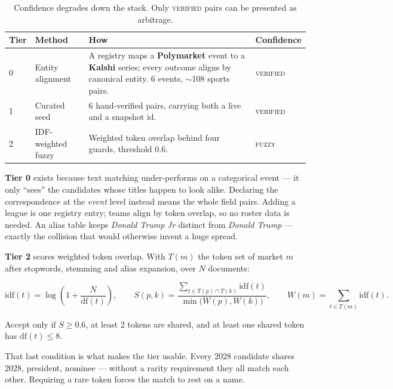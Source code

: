 \documentclass[11pt,a4paper]{article}
\newcommand{\code}[1]{{\ttfamily\small #1}}
\newcommand{\PM}{{\color{poly}\textbf{Polymarket}}}
\newcommand{\KS}{{\color{kalshi}\textbf{Kalshi}}}
\begin{document}
\begin{table}[htbp]
\centering\small
\begin{tabularx}{\textwidth}{@{}p{1.3cm}p{2.8cm}Xp{1.7cm}@{}}
\toprule
\textbf{Tier} & \textbf{Method} & \textbf{How} & \textbf{Confidence} \\
\midrule
0 & Entity alignment & A registry maps a \PM{} event to a \KS{} series; every outcome aligns by
  canonical entity. 6 events, $\sim$108 sports pairs. & \textsc{verified} \\
1 & Curated seed & 6 hand-verified pairs, carrying both a live and a snapshot id. & \textsc{verified} \\
2 & IDF-weighted fuzzy & Weighted token overlap behind four guards, threshold $0.6$. & \textsc{fuzzy} \\
\bottomrule
\end{tabularx}
\caption{Confidence degrades down the stack. Only \textsc{verified} pairs can be presented as
arbitrage.}
\end{table}

\textbf{Tier 0} exists because text matching under-performs on a categorical event --- it only
``sees'' the candidates whose titles happen to look alike. Declaring the correspondence at the
\emph{event} level instead means the whole field pairs. Adding a league is one registry entry;
teams align by token overlap, so no roster data is needed. An alias table keeps \emph{Donald
Trump Jr} distinct from \emph{Donald Trump} --- exactly the collision that would otherwise
invent a huge spread.

\textbf{Tier 2} scores weighted token overlap. With $T(m)$ the token set of market $m$ after
stopwords, stemming and alias expansion, over $N$ documents:

\begin{equation}
\mathrm{idf}(t) = \log\!\left(1 + \frac{N}{\mathrm{df}(t)}\right),
\qquad
S(p,k) = \frac{\sum_{t \in T(p) \cap T(k)} \mathrm{idf}(t)}
              {\min\bigl(W(p), W(k)\bigr)},
\qquad
W(m) = \!\!\sum_{t \in T(m)}\!\! \mathrm{idf}(t) .
\end{equation}

Accept only if $S \geq 0.6$, at least 2 tokens are shared, and at least one shared token has
$\mathrm{df}(t) \leq 8$.

That last condition is what makes the tier usable. Every 2028 candidate shares \code{2028},
\code{president}, \code{nominee} --- without a rarity requirement they all match each other.
Requiring a rare token forces the match to rest on a name.
\end{document}
